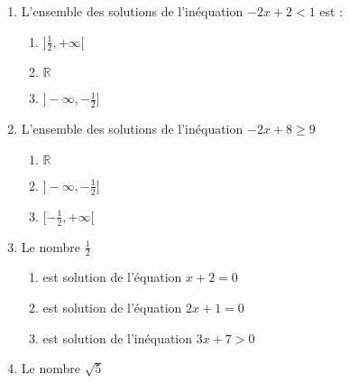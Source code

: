\documentclass[oneside,twocolumn,landscape]{book}
\begin{document}
\begin{enumerate}






\item L'ensemble des solutions de l'inéquation $-2 x+2<1$ est :
\begin{enumerate}

\item\BonneReponse $]\frac{1}{2},+\infty[$

\item\MauvaiseReponse $\mathbb{R}$

\item\MauvaiseReponse $]-\infty, -\frac{1}{2}]$

\end{enumerate}



\item L'ensemble des solutions de l'inéquation $-2x+8 \geqslant 9$

\begin{enumerate}


\item\MauvaiseReponse $\mathbb{R}$



\item\BonneReponse $]-\infty,-\frac{1}{2}]$

\item\MauvaiseReponse $[-\frac{1}{2},+\infty[$


\end{enumerate}






\item Le nombre $\frac{1}{2}$

\begin{enumerate}


\item\MauvaiseReponse est solution de l'équation $x+2=0$

\item\MauvaiseReponse est solution de l'équation $2x+1=0$



\item\BonneReponse est solution de l'inéquation $3x+7>0$


\end{enumerate}




\item Le nombre $\sqrt{5}$


\end{enumerate}
\end{document}
